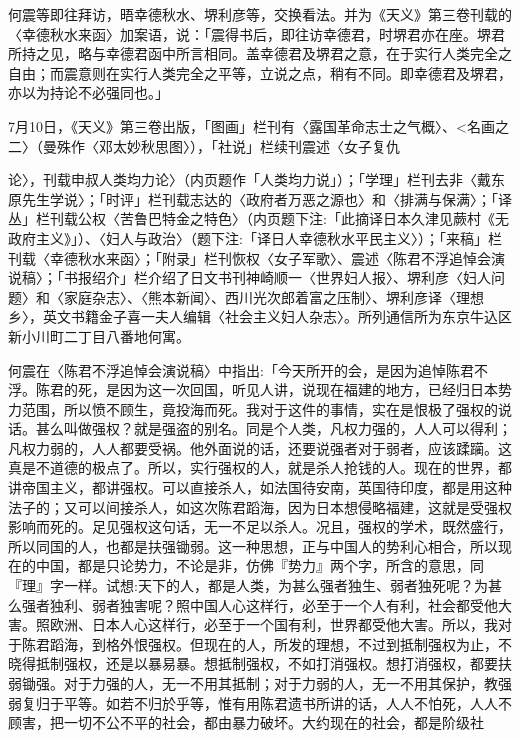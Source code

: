 何震等即往拜访，晤幸德秋水、堺利彦等，交换看法。并为《天义》第三卷刊载的〈幸德秋水来函〉加案语，说：「震得书后，即往访幸德君，时堺君亦在座。堺君所持之见，略与幸德君函中所言相同。盖幸德君及堺君之意，在于实行人类完全之自由；而震意则在实行人类完全之平等，立说之点，稍有不同。即幸德君及堺君，亦以为持论不必强同也。」

7月10日，《天义》第三卷出版，「图画」栏刊有〈露国革命志士之气概〉、<名画之二〉（曼殊作〈邓太妙秋思图〉），「社说」栏续刊震述〈女子复仇


\noindent 论〉，刊载申叔人类均力论〉（内页题作「人类均力说」）；「学理」栏刊去非〈戴东原先生学说〉；「时评」栏刊载志达的〈政府者万恶之源也〉和〈排满与保满〉；「译丛」栏刊载公权〈苦鲁巴特金之特色〉（内页题下注:「此摘译日本久津见蕨村《无政府主义》」）、〈妇人与政治〉（题下注:「译日人幸德秋水平民主义〉）；「来稿」栏刊载〈幸德秋水来函〉；「附录」栏刊恢权〈女子军歌〉、震述〈陈君不浮追悼会演说稿〉；「书报绍介」栏介绍了日文书刊神崎顺一〈世界妇人报〉、堺利彦〈妇人问题〉和〈家庭杂志〉、〈熊本新闻〉、西川光次郎着富之压制〉、堺利彦译〈理想乡〉，英文书籍金子喜一夫人编辑〈社会主义妇人杂志〉。所列通信所为东京牛込区新小川町二丁目八番地何寓。

何震在〈陈君不浮追悼会演说稿〉中指出:「今天所开的会，是因为追悼陈君不浮。陈君的死，是因为这一次回国，听见人讲，说现在福建的地方，已经归日本势力范围，所以愤不顾生，竟投海而死。我对于这件的事情，实在是恨极了强权的说话。甚么叫做强权？就是强盗的别名。同是个人类，凡权力强的，人人可以得利；凡权力弱的，人人都要受祸。他外面说的话，还要说强者对于弱者，应该蹂躏。这真是不道德的极点了。所以，实行强权的人，就是杀人抢钱的人。现在的世界，都讲帝国主义，都讲强权。可以直接杀人，如法国待安南，英国待印度，都是用这种法子的；又可以间接杀人，如这次陈君蹈海，因为日本想侵略福建，这就是受强权影响而死的。足见强权这句话，无一不足以杀人。况且，强权的学术，既然盛行，所以同国的人，也都是扶强锄弱。这一种思想，正与中国人的势利心相合，所以现在的中国，都是只论势力，不论是非，仿佛『势力』两个字，所含的意思，同『理』字一样。试想:天下的人，都是人类，为甚么强者独生、弱者独死呢？为甚么强者独利、弱者独害呢？照中国人心这样行，必至于一个人有利，社会都受他大害。照欧洲、日本人心这样行，必至于一个国有利，世界都受他大害。所以，我对于陈君蹈海，到格外恨强权。但现在的人，所发的理想，不过到抵制强权为止，不晓得抵制强权，还是以暴易暴。想抵制强权，不如打消强权。想打消强权，都要扶弱锄强。对于力强的人，无一不用其抵制；对于力弱的人，无一不用其保护，教强弱复归于平等。如若不归於乎等，惟有用陈君遗书所讲的话，人人不怕死，人人不顾害，把一切不公不平的社会，都由暴力破坏。大约现在的社会，都是阶级社


